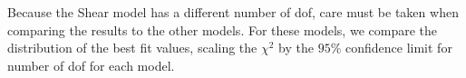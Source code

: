 Because the Shear model has a different number of dof, care must be taken when comparing the results to the other models. For these models, we compare the distribution of the best fit values, scaling the $\chi^2$ by the $95\%$ confidence limit for number of dof for each model.